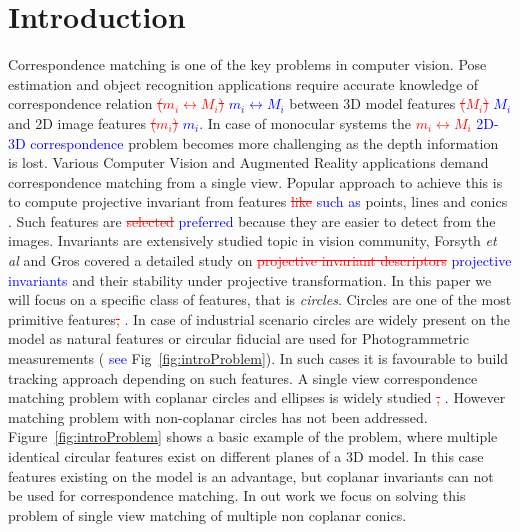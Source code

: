 \documentclass{bmvc2k}
\newcommand{\yuji}[2]{\textcolor{red}{\sout{#1}} \textcolor{blue}{#2}}  %
\newcommand{\fref}[1]{Fig\bmvaOneDot~\ref{#1}}
\newcommand{\Fref}[1]{Figure~\ref{#1}}
\def\etal{\emph{et al}\bmvaOneDot}
\begin{document}
\section{Introduction}
\label{sec:intro}

Correspondence matching is one of the key problems in computer vision.
Pose estimation and object recognition applications require accurate knowledge of correspondence relation \yuji{($ m_i \leftrightarrow M_i $)}{$ m_i \leftrightarrow M_i $} between 3D model features \yuji{($ M_i $)}{$ M_i $} and 2D image features \yuji{($ m_i $)}{$ m_i $}. 
In case of monocular systems the \yuji{$ m_i \leftrightarrow M_i $}{2D-3D correspondence} problem becomes more challenging as the depth information is lost.
Various Computer Vision and Augmented Reality applications demand correspondence matching from a single view.
Popular approach to achieve this is to compute projective invariant from features \yuji{like}{such as} points, lines and conics \cite{hartley_multiple_2003}.
Such features are \yuji{selected}{preferred} because they are easier to detect from the images. 
Invariants are extensively studied topic in vision community, Forsyth \etal \cite{forsyth_91} and Gros \cite{gros_projective_1992} covered a detailed study on \yuji{projective invariant descriptors}{projective invariants} and their stability under projective transformation. 
In this paper we will focus on a specific class of features, that is \textit{circles}. 
Circles are one of the most primitive features\yuji{,}{.}
In case of industrial scenario circles are widely present on the model as natural features or circular fiducial are used for Photogrammetric measurements \cite{luhmann_close_2006} (\yuji{}{see} \fref{fig:introProblem}).
In such cases it is favourable to build tracking approach depending on such features. 
A single view correspondence matching problem with coplanar circles and ellipses is widely studied \cite{lepetit_monocular_2005}\yuji{,}{.}
However matching problem with non-coplanar circles has not been addressed. 
\Fref{fig:introProblem} shows a basic example of the problem, where multiple identical circular features exist on different planes of a 3D model.
In this case features existing on the model is an advantage, but coplanar invariants can not be used for correspondence matching.
In out work we focus on solving this problem of single view matching of multiple non coplanar conics. 
\end{document}
